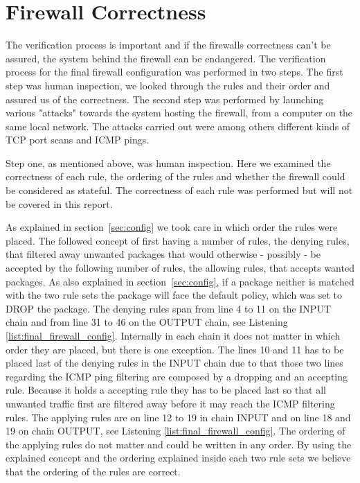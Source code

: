 \section{Firewall Correctness}
\label{sec:correctness}

The verification process is important and if the firewalls correctness can't be assured, the system behind the firewall can be endangered. The verification process for the final firewall configuration was performed in two steps. The first step was human inspection, we looked through the rules and their order and assured us of the correctness. The second step was performed by launching various "attacks" towards the system hosting the firewall, from a computer on the same local network. The attacks carried out were among others different kinds of TCP port scans and ICMP pings.

Step one, as mentioned above, was human inspection. Here we examined the correctness of each rule, the ordering of the rules and whether the firewall could be considered as stateful. The correctness of each rule was performed but will not be covered in this report.  

As explained in section~\ref{sec:config} we took care in which order the rules were placed. The followed concept of first having a number of rules, the denying rules, that filtered away unwanted packages that would otherwise - possibly - be accepted by the following number of rules, the allowing rules, that accepts wanted packages. As also explained in section~\ref{sec:config}, if a package neither is matched with the two rule sets the package will face the default policy, which was set to DROP the package. The denying rules span from line 4 to 11 on the INPUT chain and from line 31 to 46 on the OUTPUT chain, see Listening \ref{list:final_firewall_config}. Internally in each chain it does not matter in which order they are placed, but there is one exception. The lines 10 and 11 has to be placed last of the denying rules in the INPUT chain due to that those two lines regarding the ICMP ping filtering are composed by a dropping and an accepting rule. Because it holds a accepting rule they has to be placed last so that all unwanted traffic first are filtered away before it may reach the ICMP filtering rules. The applying rules are on line 12 to 19 in chain INPUT and on line 18 and 19 on chain OUTPUT, see Listening \ref{list:final_firewall_config}. The ordering of the applying rules do not matter and could be written in any order. By using the explained concept and the ordering explained inside each two rule sets we believe that the ordering of the rules are correct.

